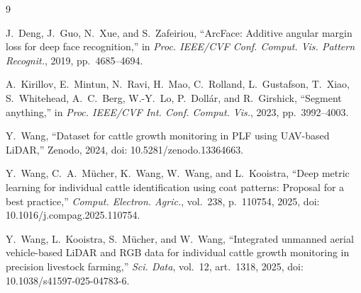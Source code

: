 \begin{thebibliography}{9}

J.~Deng, J.~Guo, N.~Xue, and S.~Zafeiriou,
``ArcFace: Additive angular margin loss for deep face recognition,''
in \emph{Proc. IEEE/CVF Conf. Comput. Vis. Pattern Recognit.}, 2019, pp.~4685--4694.

A.~Kirillov, E.~Mintun, N.~Ravi, H.~Mao, C.~Rolland, L.~Gustafson, T.~Xiao, S.~Whitehead, A.~C.~Berg, W.-Y.~Lo, P.~Doll\'ar, and R.~Girshick,
``Segment anything,''
in \emph{Proc. IEEE/CVF Int. Conf. Comput. Vis.}, 2023, pp.~3992--4003.

Y.~Wang,
``Dataset for cattle growth monitoring in PLF using UAV-based LiDAR,''
Zenodo, 2024, doi: 10.5281/zenodo.13364663.

Y.~Wang, C.~A.~M\"ucher, K.~Wang, W.~Wang, and L.~Kooistra,
``Deep metric learning for individual cattle identification using coat patterns: Proposal for a best practice,''
\emph{Comput. Electron. Agric.}, vol.~238, p.~110754, 2025, doi: 10.1016/j.compag.2025.110754.

Y.~Wang, L.~Kooistra, S.~M\"ucher, and W.~Wang,
``Integrated unmanned aerial vehicle-based LiDAR and RGB data for individual cattle growth monitoring in precision livestock farming,''
\emph{Sci. Data}, vol.~12, art.~1318, 2025, doi: 10.1038/s41597-025-04783-6.

\end{thebibliography}
